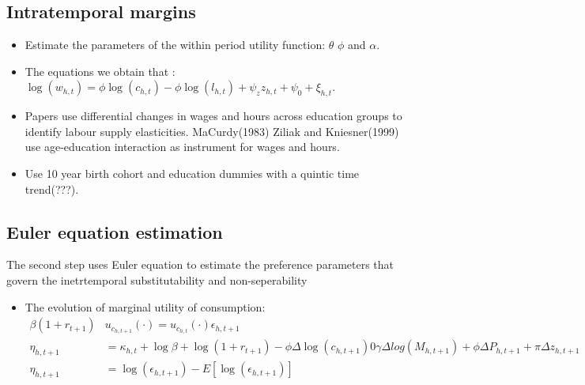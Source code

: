 \subsection{Intratemporal margins}
\begin{itemize}
    \item Estimate the parameters of the within period utility function: $\theta$ $\phi$ and $\alpha$.
    \item The equations we obtain that :
    $\log(w_{h,t}) = \phi \log(c_{h,t}) - \phi \log(l_{h,t}) + \psi_z z_{h,t} +\psi_0 + \xi_{h,t}$.
    \item Papers use differential changes in wages and hours across education groups to identify labour supply elasticities. MaCurdy(1983) Ziliak and Kniesner(1999) use age-education interaction as instrument for wages and hours.
    \item Use 10 year birth cohort and education dummies with a quintic time trend(???).
\end{itemize}

\subsection{Euler equation estimation}
The second step uses Euler equation to estimate the preference parameters that govern the inetrtemporal substitutability and non-seperability
\begin{itemize}
    \item The evolution of marginal utility of consumption:
    \[ \begin{split}
        \beta ( 1+ r_{t+1}) & u_{c_{h,t+1}}(\cdot) = u_{c_{h,t}}(\cdot) \epsilon_{h,t+1} \\
        \eta_{h,t+1} & = \kappa_{h,t} + \log \beta + \log (1 + r_{t+1}) - \phi \Delta \log(c_{h,t+1}) 0 \gamma \Delta log(M_{h,t+1}) + \phi \Delta P_{h,t+1} + \pi \Delta z_{h,t+1} \\
        \eta_{h,t+1} & = \log(\epsilon_{h,t+1}) - E[\log(\epsilon_{h,t+1})]
    \end{split}  \]
\end{itemize}
